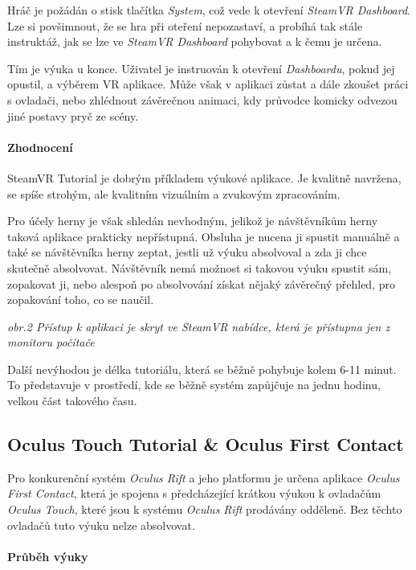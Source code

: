 Hráč je požádán o stisk tlačítka \emph{System}, což vede k otevření
\emph{SteamVR Dashboard}. Lze si povšimnout, že se hra při oteření
nepozastaví, a probíhá tak stále instruktáž, jak se lze ve \emph{SteamVR
Dashboard} pohybovat a k čemu je určena.

Tím je výuka u konce. Uživatel je instruován k otevření
\emph{Dashboardu}, pokud jej opustil, a výběrem VR aplikace. Může však v
aplikaci zůstat a dále zkoušet práci s ovladači, nebo zhlédnout
závěrečnou animaci, kdy průvodce komicky odvezou jiné postavy pryč ze
scény.

\paragraph{Zhodnocení}\label{zhodnocenuxed}

SteamVR Tutorial je dobrým příkladem výukové aplikace. Je kvalitně
navržena, se spíše strohým, ale kvalitním vizuálním a zvukovým
zpracováním.

Pro účely herny je však shledán nevhodným, jelikož je návštěvníkům herny
taková aplikace prakticky nepřístupná. Obsluha je nucena ji spustit
manuálně a také se návštěvníka herny zeptat, jestli už výuku absolvoval
a zda ji chce skutečně absolvovat. Návštěvník nemá možnost si takovou
výuku spustit sám, zopakovat ji, nebo alespoň po absolvování získat
nějaký závěrečný přehled, pro zopakování toho, co se naučil.


\emph{obr.2 Přístup k aplikaci je skryt ve SteamVR nabídce, která je
přístupna jen z monitoru počítače}

Další nevýhodou je délka tutoriálu, která se běžně pohybuje kolem 6-11
minut. To představuje v prostředí, kde se běžně systém zapůjčuje na
jednu hodinu, velkou část takového času.

\subsection{Oculus Touch Tutorial \& Oculus First
Contact}\label{oculus-touch-tutorial-oculus-first-contact}

Pro konkurenční systém \emph{Oculus Rift} a jeho platformu je určena
aplikace \emph{Oculus First Contact}, která je spojena s předcházející
krátkou výukou k ovladačům \emph{Oculus Touch}, které jsou k systému
\emph{Oculus Rift} prodávány odděleně. Bez těchto ovladačů tuto výuku
nelze absolvovat.

\paragraph{Průběh výuky}\label{prux16fbux11bh-vuxfduky-1}

